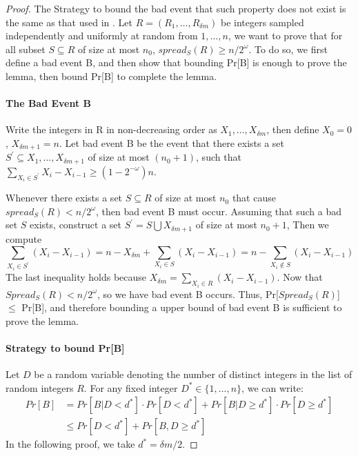 \documentclass[a4paper, oneside]{article}
\begin{document}
\begin{proof}
  The Strategy to bound the bad event that such property does not exist is the same as that used in \cite{corrigan2016balloon}.
  Let $R = (R_1, \dots, R_{\delta m})$ be integers sampled independently and uniformly at random from ${1,\dots,n}$, we want to
  prove that for all subset $S \subseteq R$ of size at most $n_0$, $spread_S(R) \geq n/2^\omega$. To do so, we first define a bad
  event B, and then show that bounding Pr[B] is enough to prove the lemma, then bound Pr[B] to complete the lemma.

  \paragraph{The Bad Event B}
  Write the integers in R in non-decreasing order as $X_1,\dots, X_{\delta m}$, then define $X_0 = 0$, $X_{\delta m+1} = n$.
  Let bad event B be the event that there exists a set $S^\prime \subseteq {X_1, \dots, X_{\delta m+1}}$ of size at most $(n_0+1)$,
  such that $\sum_{X_i\in S^\prime}{X_i - X_{i-1}} \geq (1-2^{-\omega})n$.

  Whenever there exists a set $S \subseteq R$ of size at most $n_0$ that cause $spread_S(R) < n/2^{\omega}$, then bad event B must occur.
  Assuming that such a bad set $S$ exists, construct a set $S^\prime = S \bigcup {X_{\delta m + 1}}$ of size at most $n_0 + 1$, Then we
  compute
  \begin{equation}
    \sum_{X_i \in S^\prime}{(X_i - X_{i-1})} = n - X_{\delta m} + \sum_{X_i \in S}{(X_i - X_{i-1})}
    = n - \sum_{X_i \not\in S}{(X_i - X_{i-1})}
  \end{equation}
  The last inequality holds because $X_{\delta m} = \sum_{X_i \in R}{(X_i - X_{i-1})}$. Now that $Spread_S(R) < n/2^\omega$, so we have
  bad event B occurs. Thus, Pr[$Spread_S(R)$] $\leq$ Pr[B], and therefore bounding a upper bound of bad event B is sufficient to prove the
  lemma.

  \paragraph{Strategy to bound Pr[B]}
  Let $D$ be a random variable denoting the number of distinct integers in the list of random integers $R$. For any fixed integer $D^* \in \{1,\dots,n\}$,
  we can write:
  \begin{align}
  Pr[B] &= Pr[B|D < d^*] \cdot Pr[D < d^*] + Pr[B|D \geq d^*] \cdot Pr[D \geq d^*] \\
  &\leq Pr[D < d^*] + Pr[B,D \geq d^*]
  \end{align}
  In the following proof, we take $d^* = \delta m/2$.


\end{proof}
\end{document}
